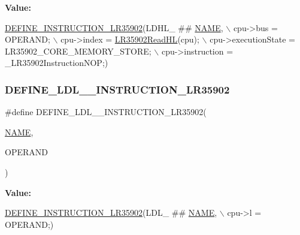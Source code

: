 {\bfseries Value\+:}
\begin{DoxyCode}
\mbox{\hyperlink{isa-lr35902_8c_a3128fc43c5d01e8b51f67901c0b4b5ef}{DEFINE\_INSTRUCTION\_LR35902}}(LDHL\_ ## \mbox{\hyperlink{inflate_8h_a164ea0159d5f0b5f12a646f25f99eceaa67bc2ced260a8e43805d2480a785d312}{NAME}}, \(\backslash\)
        cpu->bus = OPERAND; \(\backslash\)
        cpu->index = \mbox{\hyperlink{isa-lr35902_8c_a2aecac31902540d73a813542994471ff}{LR35902ReadHL}}(cpu); \(\backslash\)
        cpu->executionState = LR35902\_CORE\_MEMORY\_STORE; \(\backslash\)
        cpu->instruction = \_LR35902InstructionNOP;)
\end{DoxyCode}
\mbox{\label{isa-lr35902_8c_a933ddbcc7602e5fecf75306d302fad22}} 
\subsubsection{\texorpdfstring{D\+E\+F\+I\+N\+E\+\_\+\+L\+D\+L\+\_\+\+\_\+\+I\+N\+S\+T\+R\+U\+C\+T\+I\+O\+N\+\_\+\+L\+R35902}{DEFINE\_LDL\_\_INSTRUCTION\_LR35902}}
{\footnotesize\ttfamily \#define D\+E\+F\+I\+N\+E\+\_\+\+L\+D\+L\+\_\+\+\_\+\+I\+N\+S\+T\+R\+U\+C\+T\+I\+O\+N\+\_\+\+L\+R35902(\begin{DoxyParamCaption}\item[{}]{\mbox{\hyperlink{inflate_8h_a164ea0159d5f0b5f12a646f25f99eceaa67bc2ced260a8e43805d2480a785d312}{N\+A\+ME}},  }\item[{}]{O\+P\+E\+R\+A\+ND }\end{DoxyParamCaption})}

{\bfseries Value\+:}
\begin{DoxyCode}
\mbox{\hyperlink{isa-lr35902_8c_a3128fc43c5d01e8b51f67901c0b4b5ef}{DEFINE\_INSTRUCTION\_LR35902}}(LDL\_ ## \mbox{\hyperlink{inflate_8h_a164ea0159d5f0b5f12a646f25f99eceaa67bc2ced260a8e43805d2480a785d312}{NAME}}, \(\backslash\)
        cpu->l = OPERAND;)
\end{DoxyCode}
\mbox{\label{isa-lr35902_8c_aded2ca3c52ab860a9e755505f8e9d941}} 

